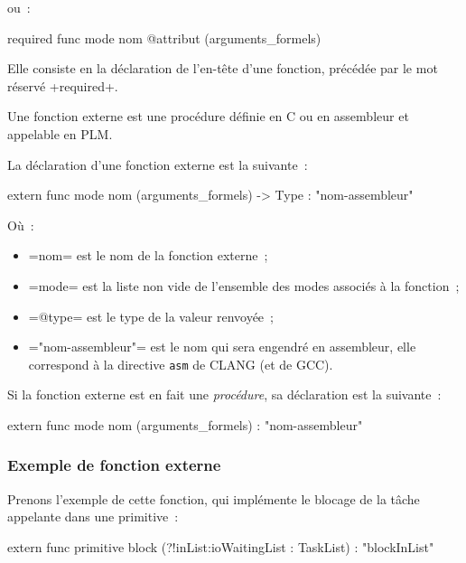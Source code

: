 ou~:

\begin{PLM}
required func mode nom @attribut (arguments_formels)
\end{PLM}

Elle consiste en la déclaration de l'en-tête d'une fonction, précédée par le mot réservé \plm+required+.








Une fonction externe est une procédure définie en C ou en assembleur et appelable en PLM.

La déclaration d'une fonction externe est la suivante~:

\begin{PLM}
extern func mode nom (arguments_formels) -> Type : "nom-assembleur"
\end{PLM}
Où~:
\begin{itemize}
  \item \plm=nom= est le nom de la fonction externe~;
  \item \plm=mode= est la liste non vide de l'ensemble des modes associés à la fonction~;
  \item \plm=@type= est le type de la valeur renvoyée~;
  \item \plm="nom-assembleur"= est le nom qui sera engendré en assembleur, elle correspond à la directive \texttt{asm} de CLANG (et de GCC).
\end{itemize}

Si la fonction externe est en fait une \emph{procédure}, sa déclaration est la suivante~:

\begin{PLM}
extern func mode nom (arguments_formels) : "nom-assembleur"
\end{PLM}

\subsubsection{Exemple de fonction externe}

Prenons l'exemple de cette fonction, qui implémente le blocage de la tâche appelante dans une primitive~:

\begin{PLM}
extern func
primitive block (?!inList:ioWaitingList : TaskList) : "blockInList"
\end{PLM}

